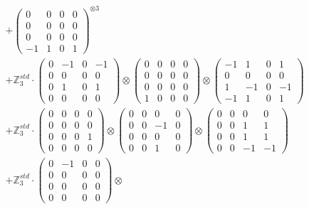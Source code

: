 \documentclass{article}
\begin{document}
{\begin{align}
        &+ \label{Rs16-Rc11-Solution-3-c16} \begin{pmatrix} 0 & 0 & 0 & 0 \\ 0 & 0 & 0 & 0 \\ 0 & 0 & 0 & 0 \\ -1 & 1 & 0 & 1 \end{pmatrix}^{\otimes 3} \\
        &+ \label{Rs16-Rc11-Solution-3-c17} \mathbb{Z}_3^{std} \cdot 
            \begin{pmatrix} 0 & -1 & 0 & -1 \\ 0 & 0 & 0 & 0 \\ 0 & 1 & 0 & 1 \\ 0 & 0 & 0 & 0 \end{pmatrix} \otimes 
            \begin{pmatrix} 0 & 0 & 0 & 0 \\ 0 & 0 & 0 & 0 \\ 0 & 0 & 0 & 0 \\ 1 & 0 & 0 & 0 \end{pmatrix} \otimes 
            \begin{pmatrix} -1 & 1 & 0 & 1 \\ 0 & 0 & 0 & 0 \\ 1 & -1 & 0 & -1 \\ -1 & 1 & 0 & 1 \end{pmatrix} \\ 
        &+ \label{Rs16-Rc11-Solution-3-c18} \mathbb{Z}_3^{std} \cdot 
            \begin{pmatrix} 0 & 0 & 0 & 0 \\ 0 & 0 & 0 & 0 \\ 0 & 0 & 0 & 1 \\ 0 & 0 & 0 & 0 \end{pmatrix} \otimes 
            \begin{pmatrix} 0 & 0 & 0 & 0 \\ 0 & 0 & -1 & 0 \\ 0 & 0 & 0 & 0 \\ 0 & 0 & 1 & 0 \end{pmatrix} \otimes 
            \begin{pmatrix} 0 & 0 & 0 & 0 \\ 0 & 0 & 1 & 1 \\ 0 & 0 & 1 & 1 \\ 0 & 0 & -1 & -1 \end{pmatrix} \\ 
        &+ \label{Rs16-Rc11-Solution-3-c19} \mathbb{Z}_3^{std} \cdot 
            \begin{pmatrix} 0 & -1 & 0 & 0 \\ 0 & 0 & 0 & 0 \\ 0 & 0 & 0 & 0 \\ 0 & 0 & 0 & 0 \end{pmatrix} \otimes 

\end{align}}
\end{document}
